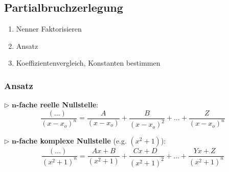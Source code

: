 \subsection{Partialbruchzerlegung}
    \begin{enumerate}
        \item Nenner Faktorisieren
        \item Ansatz
        \item Koeffizientenvergleich, Konstanten bestimmen
    \end{enumerate}
    \subsubsection*{Ansatz}
        $\triangleright$ \textbf{$\boldsymbol{n}$-fache reelle Nullstelle}:
        $$
            \frac{(\dots)\phantom{^n}}{(x-x_o)^n} = \frac{A}{(x-x_o)} + \frac{B}{(x-x_o)^2} + \dots + \frac{Z}{(x-x_o)^n}
        $$


        $\triangleright$ \textbf{$\boldsymbol{n}$-fache komplexe Nullstelle} (e.g. $(x^2+1)$):
        $$
            \frac{(\dots)\phantom{^n}}{(x^2+1)^n} = \frac{Ax+B}{(x^2+1)} + \frac{Cx+D\phantom{^2}}{(x^2+1)^2} + \dots + \frac{Yx+Z\phantom{^n}}{(x^2+1)^n}
        $$
        \vspace{0.1em}